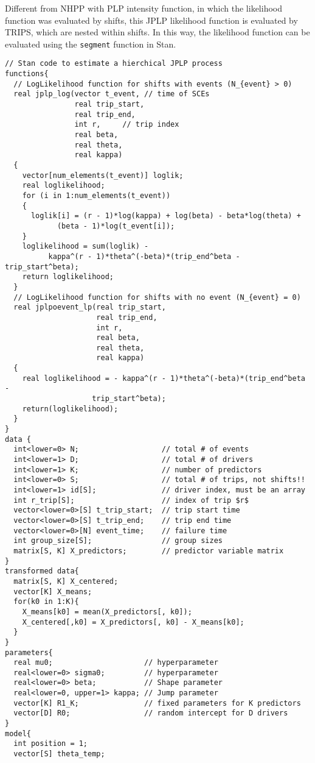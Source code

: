 \documentclass[
]{article}
\begin{document}
Different from NHPP with PLP intensity function, in which the likelihood
function was evaluated by shifts, this JPLP likelihood function is
evaluated by TRIPS, which are nested within shifts. In this way, the
likelihood function can be evaluated using the \texttt{segment} function
in Stan.

\begin{verbatim}
// Stan code to estimate a hierchical JPLP process
functions{
  // LogLikelihood function for shifts with events (N_{event} > 0)
  real jplp_log(vector t_event, // time of SCEs
                real trip_start,
                real trip_end,
                int r,     // trip index
                real beta,
                real theta,
                real kappa)
  {
    vector[num_elements(t_event)] loglik;
    real loglikelihood;
    for (i in 1:num_elements(t_event))
    {
      loglik[i] = (r - 1)*log(kappa) + log(beta) - beta*log(theta) + 
            (beta - 1)*log(t_event[i]);
    }
    loglikelihood = sum(loglik) - 
          kappa^(r - 1)*theta^(-beta)*(trip_end^beta - trip_start^beta);
    return loglikelihood;
  }
  // LogLikelihood function for shifts with no event (N_{event} = 0)
  real jplpoevent_lp(real trip_start,
                     real trip_end,
                     int r,
                     real beta,
                     real theta,
                     real kappa)
  {
    real loglikelihood = - kappa^(r - 1)*theta^(-beta)*(trip_end^beta - 
                    trip_start^beta);
    return(loglikelihood);
  }
}
data {
  int<lower=0> N;                   // total # of events
  int<lower=1> D;                   // total # of drivers
  int<lower=1> K;                   // number of predictors
  int<lower=0> S;                   // total # of trips, not shifts!!
  int<lower=1> id[S];               // driver index, must be an array
  int r_trip[S];                    // index of trip $r$
  vector<lower=0>[S] t_trip_start;  // trip start time
  vector<lower=0>[S] t_trip_end;    // trip end time
  vector<lower=0>[N] event_time;    // failure time
  int group_size[S];                // group sizes
  matrix[S, K] X_predictors;        // predictor variable matrix
}
transformed data{
  matrix[S, K] X_centered;
  vector[K] X_means;
  for(k0 in 1:K){
    X_means[k0] = mean(X_predictors[, k0]);
    X_centered[,k0] = X_predictors[, k0] - X_means[k0];
  }
}
parameters{
  real mu0;                     // hyperparameter
  real<lower=0> sigma0;         // hyperparameter
  real<lower=0> beta;           // Shape parameter
  real<lower=0, upper=1> kappa; // Jump parameter
  vector[K] R1_K;               // fixed parameters for K predictors
  vector[D] R0;                 // random intercept for D drivers
}
model{
  int position = 1;
  vector[S] theta_temp;


\end{verbatim}
\end{document}
